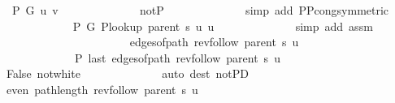 \begin{isabellebody}
\ {\isachardoublequoteopen}{\isasymnot}\ P\ G{}\ u\ v{\isachardoublequoteclose}\isanewline
\ \ \ \ \ \ \ \ \ \ \ \ \isamarkupfalse%
\ not{\isacharunderscore}{\kern0pt}P{\isacharprime}{\kern0pt}{\isacharprime}{\kern0pt}\isanewline
\ \ \ \ \ \ \ \ \ \ \ \ \isamarkupfalse%
\ {\isacharparenleft}{\kern0pt}simp\ add{\isacharcolon}{\kern0pt}\ P{\isacharunderscore}{\kern0pt}P{\isacharprime}{\kern0pt}{\isacharprime}{\kern0pt}{\isacharunderscore}{\kern0pt}cong{\isacharbrackleft}{\kern0pt}symmetric{\isacharbrackright}{\kern0pt}{\isacharparenright}{\kern0pt}\isanewline
\ \ \ \ \ \ \ \ \ \ \isamarkupfalse%
\ {\isachardoublequoteopen}{\isasymnot}\ P{\isacharprime}{\kern0pt}\ G{}\ {\isacharparenleft}{\kern0pt}P{\isacharunderscore}{\kern0pt}lookup\ {\isacharparenleft}{\kern0pt}parent\ s{\isacharparenright}{\kern0pt}\ u{\isacharparenright}{\kern0pt}\ u{\isachardoublequoteclose}\isanewline
\ \ \ \ \ \ \ \ \ \ \ \ \isamarkupfalse%
\ {\isacharparenleft}{\kern0pt}simp\ add{\isacharcolon}{\kern0pt}\ assm{\isacharparenright}{\kern0pt}\isanewline
\ \ \ \ \ \ \ \ \ \ \isamarkupfalse%
\isanewline
\ \ \ \ \ \ \ \ \ \ \ \ {\isachardoublequoteopen}edges{\isacharunderscore}{\kern0pt}of{\isacharunderscore}{\kern0pt}path\ {\isacharparenleft}{\kern0pt}rev{\isacharunderscore}{\kern0pt}follow\ {\isacharparenleft}{\kern0pt}parent\ s{\isacharparenright}{\kern0pt}\ u{\isacharparenright}{\kern0pt}\ {\isasymnoteq}\ {\isacharbrackleft}{\kern0pt}{\isacharbrackright}{\kern0pt}{\isachardoublequoteclose}\isanewline
\ \ \ \ \ \ \ \ \ \ \ \ {\isachardoublequoteopen}{\isasymnot}\ P{\isacharprime}{\kern0pt}{\isacharprime}{\kern0pt}\ {\isacharparenleft}{\kern0pt}last\ {\isacharparenleft}{\kern0pt}edges{\isacharunderscore}{\kern0pt}of{\isacharunderscore}{\kern0pt}path\ {\isacharparenleft}{\kern0pt}rev{\isacharunderscore}{\kern0pt}follow\ {\isacharparenleft}{\kern0pt}parent\ s{\isacharparenright}{\kern0pt}\ u{\isacharparenright}{\kern0pt}{\isacharparenright}{\kern0pt}{\isacharparenright}{\kern0pt}{\isachardoublequoteclose}\isanewline
\ \ \ \ \ \ \ \ \ \ \ \ \isamarkupfalse%
\ False\ not{\isacharunderscore}{\kern0pt}white\isanewline
\ \ \ \ \ \ \ \ \ \ \ \ \isamarkupfalse%
\ {\isacharparenleft}{\kern0pt}auto\ dest{\isacharcolon}{\kern0pt}\ not{\isacharunderscore}{\kern0pt}P{\isacharprime}{\kern0pt}D{\isacharparenright}{\kern0pt}\isanewline
\ \ \ \ \ \ \ \ \ \ \isamarkupfalse%
\ {\isachardoublequoteopen}even\ {\isacharparenleft}{\kern0pt}path{\isacharunderscore}{\kern0pt}length\ {\isacharparenleft}{\kern0pt}rev{\isacharunderscore}{\kern0pt}follow\ {\isacharparenleft}{\kern0pt}parent\ s{\isacharparenright}{\kern0pt}\ u{\isacharparenright}{\kern0pt}{\isacharparenright}{\kern0pt}{\isachardoublequoteclose}\isanewline

\end{isabellebody}
